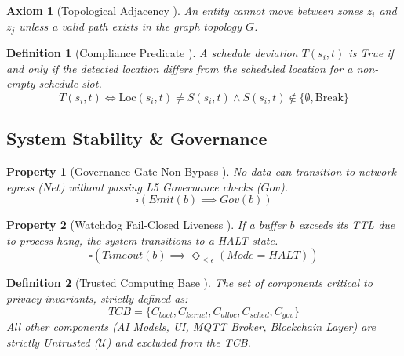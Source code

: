 \documentclass[conference]{IEEEtran}
\newtheorem{definition}{Definition}
\newtheorem{axiom}{Axiom}
\newtheorem{property}{Property}
\begin{document}
\begin{axiom}[Topological Adjacency \cite{P7}]
An entity cannot move between zones $z_i$ and $z_j$ unless a valid path exists in the graph topology $G$.
\end{axiom}

\begin{definition}[Compliance Predicate \cite{P4}]
A schedule deviation $T(s_i, t)$ is True if and only if the detected location differs from the scheduled location for a non-empty schedule slot.
\begin{equation}
T(s_i, t) \iff \text{Loc}(s_i, t) \neq S(s_i, t) \land S(s_i, t) \notin \{\emptyset, \text{Break}\}
\end{equation}
\end{definition}

\subsection{System Stability & Governance}

\begin{property}[Governance Gate Non-Bypass \cite{P19}]
No data can transition to network egress ($Net$) without passing L5 Governance checks ($Gov$).
\begin{equation}
\square \left( Emit(b) \implies Gov(b) \right)
\end{equation}
\end{property}

\begin{property}[Watchdog Fail-Closed Liveness \cite{P19}]
If a buffer $b$ exceeds its TTL due to process hang, the system transitions to a HALT state.
\begin{equation}
\square \left( Timeout(b) \implies \Diamond_{\le \epsilon} (Mode = HALT) \right)
\end{equation}
\end{property}

\begin{definition}[Trusted Computing Base \cite{P19}]
The set of components critical to privacy invariants, strictly defined as:
\begin{equation}
TCB = \{ C_{boot}, C_{kernel}, C_{alloc}, C_{sched}, C_{gov} \}
\end{equation}
All other components (AI Models, UI, MQTT Broker, Blockchain Layer) are strictly \textit{Untrusted} ($\mathcal{U}$) and excluded from the TCB.
\end{definition}
\end{document}
